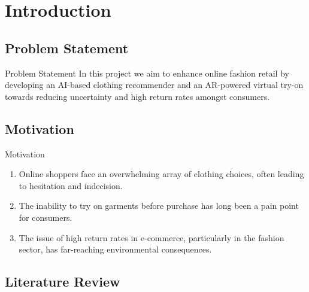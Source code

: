 \section{Introduction}

\subsection{Problem Statement}
\begin{frame}{Problem Statement}
	In this project we aim to enhance online fashion retail by developing an AI-based clothing recommender and an AR-powered virtual try-on towards reducing uncertainty and high return rates amongst consumers.
\end{frame}

\subsection{Motivation}
\begin{frame}{Motivation}
	\begin{enumerate}
		\item Online shoppers face an overwhelming array of clothing choices, often leading to hesitation and indecision.
		\item The inability to try on garments before purchase has long been a pain point for consumers.
		\item The issue of high return rates in e-commerce, particularly in the fashion sector, has far-reaching environmental consequences.
	\end{enumerate}
\end{frame}

\subsection{Literature Review}
\newcommand{\checkif}[1]{
	\ifthenelse{\equal{#1}{Y}}{\checkmark}{}
}
\newcommand{\rsrow}[8]{
	\citeauthor{#1} \cite{#1} & #2 &
	\checkif{#3} &
	\checkif{#4} &
	\checkif{#6} &
	\checkif{#8}
	\\ \hline
}


